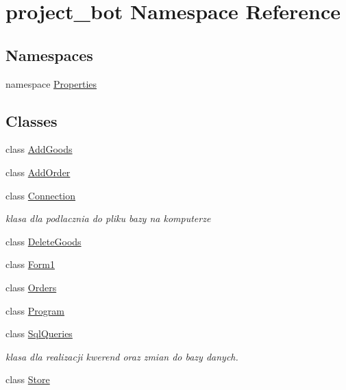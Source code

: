 \hypertarget{namespaceproject__bot}{}\section{project\+\_\+bot Namespace Reference}
\label{namespaceproject__bot}
\subsection*{Namespaces}
\begin{DoxyCompactItemize}
\item 
namespace \hyperlink{namespaceproject__bot_1_1_properties}{Properties}
\end{DoxyCompactItemize}
\subsection*{Classes}
\begin{DoxyCompactItemize}
\item 
class \hyperlink{classproject__bot_1_1_add_goods}{Add\+Goods}
\item 
class \hyperlink{classproject__bot_1_1_add_order}{Add\+Order}
\item 
class \hyperlink{classproject__bot_1_1_connection}{Connection}
\begin{DoxyCompactList}\small\item\em klasa dla podlacznia do pliku bazy na komputerze \end{DoxyCompactList}\item 
class \hyperlink{classproject__bot_1_1_delete_goods}{Delete\+Goods}
\item 
class \hyperlink{classproject__bot_1_1_form1}{Form1}
\item 
class \hyperlink{classproject__bot_1_1_orders}{Orders}
\item 
class \hyperlink{classproject__bot_1_1_program}{Program}
\item 
class \hyperlink{classproject__bot_1_1_sql_queries}{Sql\+Queries}
\begin{DoxyCompactList}\small\item\em klasa dla realizacji kwerend oraz zmian do bazy danych. \end{DoxyCompactList}\item 
class \hyperlink{classproject__bot_1_1_store}{Store}
\end{DoxyCompactItemize}

